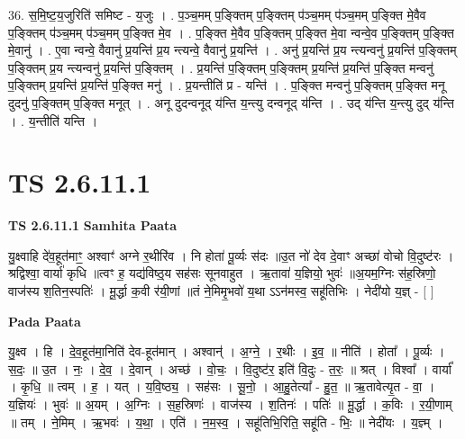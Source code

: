 \documentclass[17pt]{extarticle}
\begin{document}
36. स॒मि॒ष्ट॒य॒जुरिति॑ समिष्ट - य॒जुः । . प॒ञ्च॒मम् प॒ङ्क्तिम् प॒ङ्क्तिम् प॑ञ्च॒मम् प॑ञ्च॒मम् प॒ङ्क्ति मे॒वैव प॒ङ्क्तिम् प॑ञ्च॒मम् प॑ञ्च॒मम् प॒ङ्क्ति मे॒व । . प॒ङ्क्ति मे॒वैव प॒ङ्क्तिम् प॒ङ्क्ति मे॒वा न्वन्वे॒व प॒ङ्क्तिम् प॒ङ्क्ति मे॒वानु॑ । . ए॒वा न्वन्वे॒ वैवानु॑ प्र॒यन्ति॑ प्र॒य न्त्यन्वे॒ वैवानु॑ प्र॒यन्ति॑ । . अनु॑ प्र॒यन्ति॑ प्र॒य न्त्यन्वनु॑ प्र॒यन्ति॑ प॒ङ्क्तिम् प॒ङ्क्तिम् प्र॒य न्त्यन्वनु॑ प्र॒यन्ति॑ प॒ङ्क्तिम् । . प्र॒यन्ति॑ प॒ङ्क्तिम् प॒ङ्क्तिम् प्र॒यन्ति॑ प्र॒यन्ति॑ प॒ङ्क्ति मन्वनु॑ प॒ङ्क्तिम् प्र॒यन्ति॑ प्र॒यन्ति॑ प॒ङ्क्ति मनु॑ । . प्र॒यन्तीति॑ प्र - यन्ति॑ । . प॒ङ्क्ति मन्वनु॑ प॒ङ्क्तिम् प॒ङ्क्ति मनू दुदनु॑ प॒ङ्क्तिम् प॒ङ्क्ति मनूत् । . अनू दुदन्वनूद् य॑न्ति य॒न्त्यु दन्वनूद् य॑न्ति । . उद् य॑न्ति य॒न्त्यु दुद् य॑न्ति । . य॒न्तीति॑ यन्ति । \newline
\pagebreak
{}

\section{ TS 2.6.11.1 }

\textbf{TS 2.6.11.1 } \newline
\textbf{Samhita Paata} \newline

यु॒क्ष्वाहि दे॑व॒हूत॑माꣳ॒॒ अश्वाꣳ॑ अग्ने र॒थीरि॑व । नि होता॑ पू॒र्व्यः स॑दः ॥उ॒त नो॑ देव दे॒वाꣳ अच्छा॑ वोचो वि॒दुष्ट॑रः । श्रद्विश्वा॒ वार्या॑ कृधि ॥त्वꣳ ह॒ यद्य॑विष्ठ्॒य सह॑सः सूनवाहुत । ऋ॒तावा॑ य॒ज्ञियो॒ भुवः॑ ॥अ॒यम॒ग्निः स॑ह॒स्रिणो॒ वाज॑स्य श॒तिन॒स्पतिः॑ । मू॒र्द्धा क॒वी र॑यी॒णां ॥तं ने॒मिमृ॒भवो॑ य॒था ऽऽन॑मस्व॒ सहू॑तिभिः । नेदी॑यो य॒ज्ञ् - [  ] \newline

\textbf{Pada Paata} \newline

यु॒क्ष्व । हि । दे॒व॒हूत॑मा॒निति॑ देव-हूत॑मान् । अश्वान्॑ । अ॒ग्ने॒ । र॒थीः । इ॒व॒ ॥ नीति॑ । होता᳚ । पू॒र्व्यः । स॒दः॒ ॥ उ॒त । नः॒ । दे॒व॒ । दे॒वान् । अच्छ॑ । वो॒चः॒ । वि॒दुष्ट॑र॒ इति॑ वि॒दुः - त॒रः॒ ॥ श्रत् । विश्वा᳚ । वार्या᳚ । कृ॒धि॒ ॥ त्वम् । ह॒ । यत् । य॒वि॒ष्ठ्य॒ । सह॑सः । सू॒नो॒ । आ॒हु॒तेत्या᳚ - हु॒त॒ ॥ ऋ॒तावेत्यृ॒त - वा॒ । य॒ज्ञियः॑ । भुवः॑ ॥ अ॒यम् । अ॒ग्निः । स॒ह॒स्रिणः॑ । वाज॑स्य । श॒तिनः॑ । पतिः॑ ॥ मू॒र्द्धा । क॒विः । र॒यी॒णाम् ॥ तम् । ने॒मिम् । ऋ॒भवः॑ । य॒था॒ । एति॑ । न॒म॒स्व॒ । सहू॑तिभि॒रिति॒ सहू॑ति - भिः॒ ॥ नेदी॑यः । य॒ज्ञ्म् ।  \newline
\end{document}
